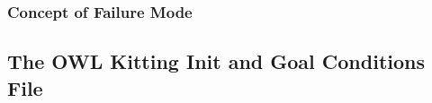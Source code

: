 \subsubsection{Concept of Failure Mode}\label{sss:failure}


\subsection{The OWL Kitting Init and Goal Conditions File} \label{owlinitgoal}
